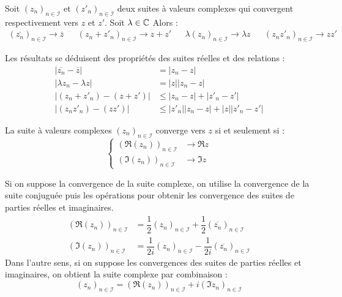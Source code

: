 \begin{prop}
 Soit $(z_n)_{n\in \mathcal I}$ et $(z'_n)_{n\in \mathcal I}$ deux suites à valeurs complexes qui convergent respectivement vers $z$ et $z'$. Soit $\lambda\in \mathbb{C}$  Alors :
\begin{align*}
 (\overline{z_n})_{n\in \mathcal I}\rightarrow \overline{z} & &
(z_n+z'_n)_{n\in \mathcal I} \rightarrow z+z'  & &
\lambda(z_n)_{n\in \mathcal I} \rightarrow \lambda z & &
(z_nz'_n)_{n\in \mathcal I} \rightarrow zz'
\end{align*}
\end{prop}
\begin{demo}
 Les résultats se déduisent des propriétés des suites réelles et des relations :
\begin{align*}
 |\overline{z_n} - \overline{z}| &= |z_n -z | \\
|\lambda z_n -\lambda z | &=|z||z_n -z |\\
|(z_n+z'_n)-(z+z')| &\leq |z_n -z | + |z'_n -z '|\\
|(z_nz'_n)-(zz')| &\leq |z'_n||z_n -z | + |z||z'_n -z '|
\end{align*}
\end{demo}
\begin{prop}
 La suite à valeurs complexes $(z_n)_{n\in \mathcal I}$ converge vers $z$ si et seulement si :
\begin{displaymath}
 \left\lbrace 
\begin{aligned}
 (\Re(z_n))_{n\in \mathcal I} &\rightarrow \Re z \\
(\Im(z_n))_{n\in \mathcal I} &\rightarrow \Im z
\end{aligned}
\right. 
\end{displaymath}
\end{prop}
\begin{demo}
 Si on suppose la convergence de la suite complexe, on utilise la convergence de la suite conjuguée puis les opérations pour obtenir les convergence des suites de parties réelles et imaginaires. 
\begin{align*}
 (\Re(z_n))_{n\in \mathcal I} &= \dfrac{1}{2}(z_n)_{n\in \mathcal I} + \dfrac{1}{2}(\overline{z_n})_{n\in \mathcal I}\\
(\Im(z_n))_{n\in \mathcal I} &= \dfrac{1}{2i}(z_n)_{n\in \mathcal I} - \dfrac{1}{2i}(\overline{z_n})_{n\in \mathcal I}
\end{align*}
Dans l'autre sens, si on suppose les convergences des suites de parties réelles et imaginaires, on obtient la suite complexe par combinaison :
\begin{displaymath}
 (z_n)_{n\in \mathcal I} = (\Re(z_n))_{n\in \mathcal I} + i(\Im z_n)_{n\in \mathcal I}
\end{displaymath}
\end{demo}
